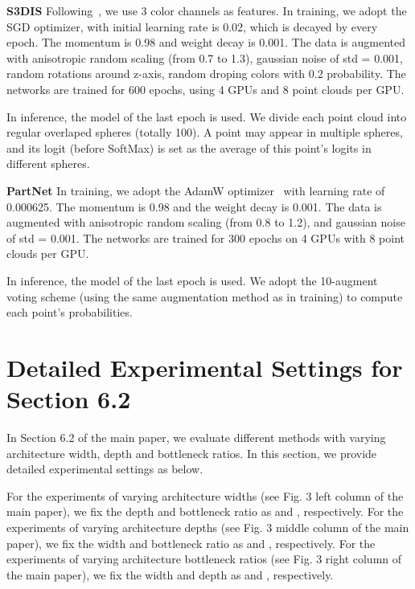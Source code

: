 \documentclass[runningheads]{llncs}
\begin{document}
\vspace{0.3em} \noindent \textbf{S3DIS}
Following~\cite{wang2018paramconv,li2018pointcnn,thomas2019kpconv}, we use 3 color channels as features.
In training, we adopt the SGD optimizer, with initial learning rate is 0.02,  which is decayed by  every epoch. The momentum is 0.98 and weight decay is 0.001. The data is augmented with anisotropic random scaling (from 0.7 to 1.3),  gaussian noise of std = 0.001, random rotations around z-axis, random droping colors with 0.2 probability. The networks are trained for 600 epochs, using 4 GPUs and 8 point clouds per GPU.

In inference, the model of the last epoch is used. We divide each point cloud into regular overlaped spheres (totally 100). A point may appear in multiple spheres, and its logit (before SoftMax) is set as the average of this point's logits in different spheres.

\vspace{0.3em} \noindent \textbf{PartNet}
In training, we adopt the AdamW optimizer~\cite{loshchilov2018decoupled} with learning rate of 0.000625. The momentum is 0.98 and the weight decay is 0.001. The data is augmented with anisotropic random scaling (from 0.8 to 1.2), and gaussian noise of std = 0.001. The networks are trained for 300 epochs on 4 GPUs with 8 point clouds per GPU.

In inference, the model of the last epoch is used. We adopt the 10-augment voting scheme (using the same augmentation method as in training) to compute each point's probabilities.

\section{Detailed Experimental Settings for Section 6.2}

In Section 6.2 of the main paper, we evaluate different methods with varying architecture width, depth and bottleneck ratios. In this section, we provide detailed experimental settings as below.

For the experiments of varying architecture widths (see Fig. 3 left column of the main paper), we fix the depth and bottleneck ratio as  and , respectively. For the experiments of varying architecture depths (see Fig. 3 middle column of the main paper), we fix the width and bottleneck ratio as  and , respectively. For the experiments of varying architecture bottleneck ratios (see Fig. 3 right column of the main paper), we fix the width and depth as  and , respectively.
\end{document}
